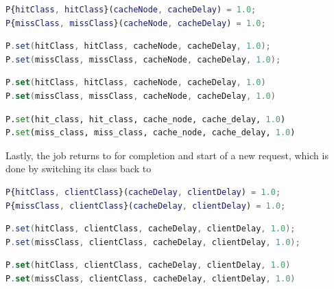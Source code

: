 \begin{MATLAB}
\begin{lstlisting}[language = matlab]
P{hitClass, hitClass}(cacheNode, cacheDelay) = 1.0;
P{missClass, missClass}(cacheNode, cacheDelay) = 1.0;
\end{lstlisting}
\end{MATLAB}
\begin{JAVA}
\begin{lstlisting}[language = java, basicstyle=\ttfamily\scriptsize]
P.set(hitClass, hitClass, cacheNode, cacheDelay, 1.0);
P.set(missClass, missClass, cacheNode, cacheDelay, 1.0);
\end{lstlisting}
\end{JAVA}
\begin{KOTLIN}
\begin{lstlisting}[language = kotlin, basicstyle=\ttfamily\scriptsize]
P.set(hitClass, hitClass, cacheNode, cacheDelay, 1.0)
P.set(missClass, missClass, cacheNode, cacheDelay, 1.0)
\end{lstlisting}
\end{KOTLIN}
\begin{PYTHON}
\begin{lstlisting}[language = python]
P.set(hit_class, hit_class, cache_node, cache_delay, 1.0)
P.set(miss_class, miss_class, cache_node, cache_delay, 1.0)
\end{lstlisting}
\end{PYTHON}
Lastly, the job returns to  for completion and start of a new request, which is done by switching its class back to 
\begin{MATLAB}
\begin{lstlisting}[language = matlab]
P{hitClass, clientClass}(cacheDelay, clientDelay) = 1.0;
P{missClass, clientClass}(cacheDelay, clientDelay) = 1.0;
\end{lstlisting}
\end{MATLAB}
\begin{JAVA}
\begin{lstlisting}[language = java, basicstyle=\ttfamily\scriptsize]
P.set(hitClass, clientClass, cacheDelay, clientDelay, 1.0);
P.set(missClass, clientClass, cacheDelay, clientDelay, 1.0);
\end{lstlisting}
\end{JAVA}
\begin{KOTLIN}
\begin{lstlisting}[language = kotlin, basicstyle=\ttfamily\scriptsize]
P.set(hitClass, clientClass, cacheDelay, clientDelay, 1.0)
P.set(missClass, clientClass, cacheDelay, clientDelay, 1.0)
\end{lstlisting}
\end{KOTLIN}
